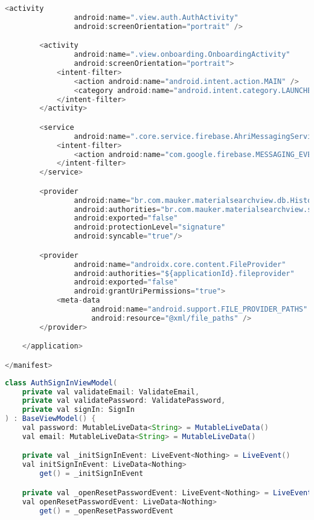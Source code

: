 \begin{asection}
\begin{lstlisting}[language=Java,label={lst:add:a_5}, caption={AndroidManifest.xml}]
        <activity
                android:name=".view.auth.AuthActivity"
                android:screenOrientation="portrait" />

        <activity
                android:name=".view.onboarding.OnboardingActivity"
                android:screenOrientation="portrait">
            <intent-filter>
                <action android:name="android.intent.action.MAIN" />
                <category android:name="android.intent.category.LAUNCHER" />
            </intent-filter>
        </activity>

        <service
                android:name=".core.service.firebase.AhriMessagingService">
            <intent-filter>
                <action android:name="com.google.firebase.MESSAGING_EVENT"/>
            </intent-filter>
        </service>

        <provider
                android:name="br.com.mauker.materialsearchview.db.HistoryProvider"
                android:authorities="br.com.mauker.materialsearchview.searchhistorydatabase"
                android:exported="false"
                android:protectionLevel="signature"
                android:syncable="true"/>

        <provider
                android:name="androidx.core.content.FileProvider"
                android:authorities="${applicationId}.fileprovider"
                android:exported="false"
                android:grantUriPermissions="true">
            <meta-data
                    android:name="android.support.FILE_PROVIDER_PATHS"
                    android:resource="@xml/file_paths" />
        </provider>

    </application>

</manifest>
\end{lstlisting}
\begin{lstlisting}[language=Java,label={lst:add:a_6}, caption={AuthSignInViewModel}]
class AuthSignInViewModel(
    private val validateEmail: ValidateEmail,
    private val validatePassword: ValidatePassword,
    private val signIn: SignIn
) : BaseViewModel() {
    val password: MutableLiveData<String> = MutableLiveData()
    val email: MutableLiveData<String> = MutableLiveData()

    private val _initSignInEvent: LiveEvent<Nothing> = LiveEvent()
    val initSignInEvent: LiveData<Nothing>
        get() = _initSignInEvent

    private val _openResetPasswordEvent: LiveEvent<Nothing> = LiveEvent()
    val openResetPasswordEvent: LiveData<Nothing>
        get() = _openResetPasswordEvent


\end{lstlisting}
\end{asection}
